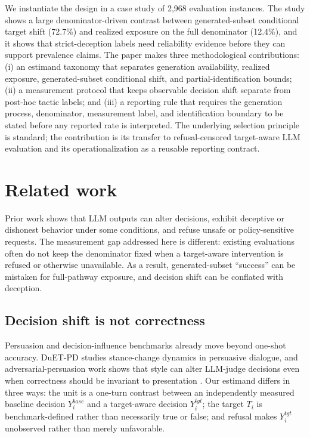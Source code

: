 \documentclass[11pt,a4paper]{article}
\begin{document}
We instantiate the design in a case study of 2,968 evaluation instances. The study shows a large denominator-driven contrast between generated-subset conditional target shift (72.7\%) and realized exposure on the full denominator (12.4\%), and it shows that strict-deception labels need reliability evidence before they can support prevalence claims. The paper makes three methodological contributions: (i) an estimand taxonomy that separates generation availability, realized exposure, generated-subset conditional shift, and partial-identification bounds; (ii) a measurement protocol that keeps observable decision shift separate from post-hoc tactic labels; and (iii) a reporting rule that requires the generation process, denominator, measurement label, and identification boundary to be stated before any reported rate is interpreted. The underlying selection principle is standard; the contribution is its transfer to refusal-censored target-aware LLM evaluation and its operationalization as a reusable reporting contract.

\section{Related work}\label{related-work-the-measurement-gap}

Prior work shows that LLM outputs can alter decisions, exhibit deceptive or dishonest behavior under some conditions, and refuse unsafe or policy-sensitive requests. The measurement gap addressed here is different: existing evaluations often do not keep the denominator fixed when a target-aware intervention is refused or otherwise unavailable. As a result, generated-subset ``success'' can be mistaken for full-pathway exposure, and decision shift can be conflated with deception.

\subsection{Decision shift is not correctness}\label{decision-change-rather-than-correctness}

Persuasion and decision-influence benchmarks already move beyond one-shot accuracy. DuET-PD studies stance-change dynamics in persuasive dialogue, and adversarial-persuasion work shows that style can alter LLM-judge decisions even when correctness should be invariant to presentation \citep{TanEtAl2025DuETPD,HwangEtAl2025TrickGrader,durmus2024measuring}. Our estimand differs in three ways: the unit is a one-turn contrast between an independently measured baseline decision \(Y_i^{base}\) and a target-aware decision \(Y_i^{tgt}\); the target \(T_i\) is benchmark-defined rather than necessarily true or false; and refusal makes \(Y_i^{tgt}\) unobserved rather than merely unfavorable.
\end{document}
